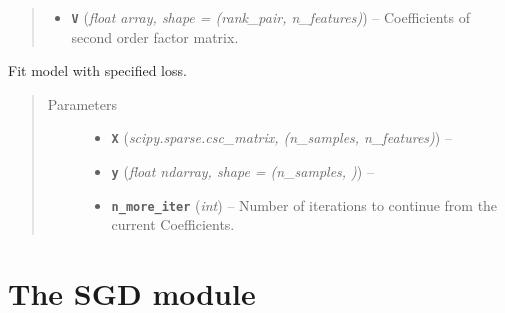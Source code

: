 \documentclass[letterpaper,10pt,english]{sphinxmanual}
\begin{document}
\begin{fulllineitems}
\begin{quote}
\begin{description}
\begin{itemize}
\item {} 
\textbf{\texttt{V}} (\emph{float \textbar{} array, shape = (rank\_pair, n\_features)}) -- Coefficients of second order factor matrix.

\end{itemize}

\end{description}\end{quote}

\begin{fulllineitems}
\label{api:fastFM.als.FMRegression.fit}
Fit model with specified loss.
\begin{quote}\begin{description}
\item[{Parameters}] \leavevmode\begin{itemize}
\item {} 
\textbf{\texttt{X}} (\emph{scipy.sparse.csc\_matrix, (n\_samples, n\_features)}) -- 

\item {} 
\textbf{\texttt{y}} (\emph{float \textbar{} ndarray, shape = (n\_samples, )}) -- 

\item {} 
\textbf{\texttt{n\_more\_iter}} (\emph{int}) -- Number of iterations to continue from the current Coefficients.

\end{itemize}

\end{description}\end{quote}

\end{fulllineitems}


\end{fulllineitems}



\section{The SGD module}
\label{api:module-fastFM.sgd}\label{api:the-sgd-module}
\end{document}
